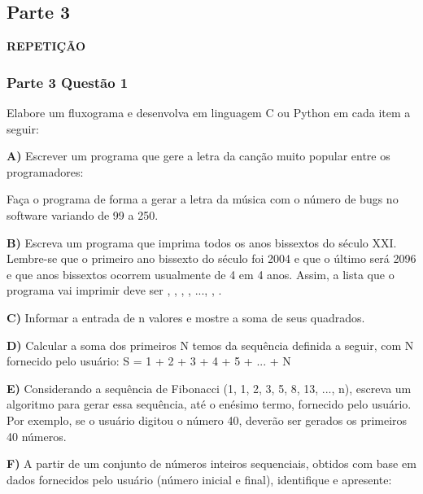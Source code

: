 \subsection*{Parte 3}

{\bfseries{R\+E\+P\+E\+T\+IÇÃO}}

\subsubsection*{Parte 3 Questão 1}


\begin{DoxyItemize}
\item Elabore um fluxograma e desenvolva em linguagem C ou Python em cada item a seguir\+:
\item {\bfseries{A)}} Escrever um programa que gere a letra da canção muito popular entre os programadores\+:
\end{DoxyItemize}


\begin{DoxyCode}{0}
\DoxyCodeLine{}
\DoxyCodeLine{}
\DoxyCodeLine{}
\end{DoxyCode}


Faça o programa de forma a gerar a letra da música com o número de bugs no software variando de 99 a 250.


\begin{DoxyItemize}
\item {\bfseries{B)}} Escreva um programa que imprima todos os anos bissextos do século X\+XI. Lembre-\/se que o primeiro ano bissexto do século foi 2004 e que o último será 2096 e que anos bissextos ocorrem usualmente de 4 em 4 anos. Assim, a lista que o programa vai imprimir deve ser {}, {}, {}, {}, {\ttfamily ...}, {}, {}.
\item {\bfseries{C)}} Informar a entrada de n valores e mostre a soma de seus quadrados.
\item {\bfseries{D)}} Calcular a soma dos primeiros N temos da sequência definida a seguir, com N fornecido pelo usuário\+: {\ttfamily S = 1 + 2 + 3 + 4 + 5 + ... + N}
\item {\bfseries{E)}} Considerando a sequência de Fibonacci {\ttfamily (1, 1, 2, 3, 5, 8, 13, ..., n)}, escreva um algoritmo para gerar essa sequência, até o enésimo termo, fornecido pelo usuário. Por exemplo, se o usuário digitou o número 40, deverão ser gerados os primeiros 40 números.
\item {\bfseries{F)}} A partir de um conjunto de números inteiros sequenciais, obtidos com base em dados fornecidos pelo usuário (número inicial e final), identifique e apresente\+:
\end{DoxyItemize}


